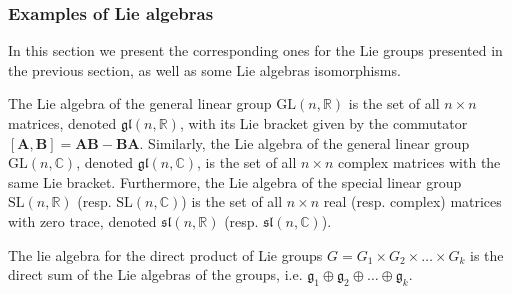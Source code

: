\subsubsection{Examples of Lie algebras}
In this section we present the corresponding ones for the Lie groups presented in the previous section, as well as some Lie algebras isomorphisms.
\begin{example}
    The Lie algebra of the general linear group $\text{GL}(n, \mathbb{R})$ is the set of all $n\times n$ matrices, denoted $\mathfrak{gl}(n, \mathbb{R})$, with its Lie bracket given by the commutator $[\mathbf{A}, \mathbf{B}] = \mathbf{A}\mathbf{B} - \mathbf{B}\mathbf{A}$. Similarly, the Lie algebra of the general linear group $\text{GL}(n, \mathbb{C})$, denoted $\mathfrak{gl}(n, \mathbb{C})$, is the set of all $n\times n$ complex matrices with the same Lie bracket. Furthermore, the Lie algebra of the special linear group $\text{SL}(n, \mathbb{R})$ (resp. $\text{SL}(n, \mathbb{C})$) is the set of all $n\times n$ real (resp. complex) matrices with zero trace, denoted $\mathfrak{sl}(n, \mathbb{R})$ (resp. $\mathfrak{sl}(n, \mathbb{C})$).
\end{example}
\begin{example}
    The lie algebra for the direct product of Lie groups $G=G_1 \times G_2 \times \dots \times G_k$ is the direct sum of the Lie algebras of the groups, i.e. $\mathfrak{g}_1\oplus\mathfrak{g}_2\oplus\dots\oplus\mathfrak{g}_k$.
\end{example}
